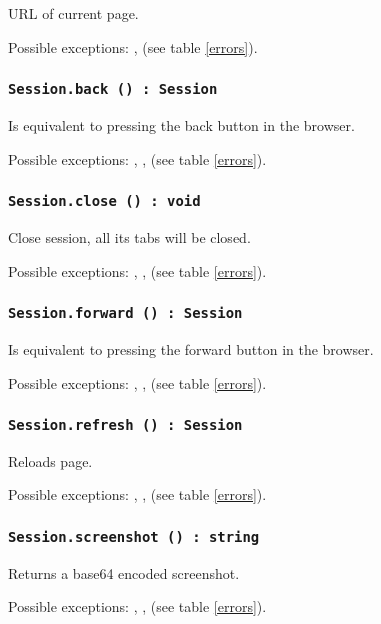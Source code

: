 URL of current page.

Possible exceptions: ,  (see table \ref{errors}).

\subsubsection{\texttt{Session.back () : Session}}

Is equivalent to pressing the back button in the browser.

Possible exceptions: , ,  (see table \ref{errors}).

\subsubsection{\texttt{Session.close () : void}}

Close session, all its tabs will be closed.

Possible exceptions: , ,  (see table \ref{errors}).

\subsubsection{\texttt{Session.forward () : Session}}

Is equivalent to pressing the forward button in the browser.

Possible exceptions: , ,  (see table \ref{errors}).

\subsubsection{\texttt{Session.refresh () : Session}}

Reloads page.

Possible exceptions: , ,  (see table \ref{errors}).

\subsubsection{\texttt{Session.screenshot () : string}}

Returns a base64 encoded screenshot.

Possible exceptions: , ,  (see table \ref{errors}).

